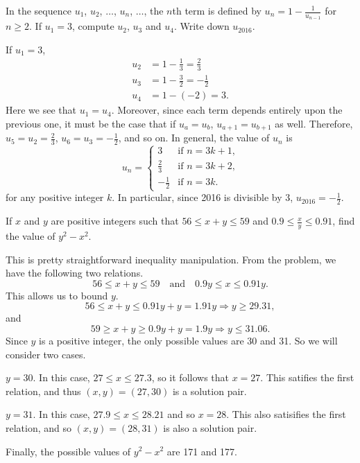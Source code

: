 \begin{question}
    In the sequence $u_{1}$, $u_{2}$, $\ldots$, $u_{n}$, $\ldots$, the $n$th
    term is defined by $u_{n} = 1 - \frac{1}{u_{n - 1}}$ for $n \geq 2$. If
    $u_{1} = 3$, compute $u_{2}$, $u_{3}$ and $u_{4}$. Write down $u_{2016}$.
\end{question}
\begin{solution} 
    If $u_1 = 3$,
    \begin{align*}
        u_2 &= 1 - \frac{1}{3} = \frac{2}{3}\\
        u_3 &= 1 - \frac{3}{2} = -\frac{1}{2}\\
        u_4 &= 1 - (-2) = 3.
    \end{align*}
    Here we see that $u_1 = u_4$. Moreover, since each term depends entirely
    upon the previous one, it must be the case that if $u_a = u_b$, $u_{a + 1}
    = u_{b + 1}$ as well. Therefore, $u_5 = u_2 = \frac{2}{3}$, $u_6 = u_3 =
    -\frac{1}{2}$, and so on. In general, the value of $u_n$ is 
    \[ u_n =
    \begin{cases}
        3 & \text{if $n = 3k + 1$,}\\
        \frac{2}{3} & \text{if $n = 3k + 2$,}\\
        -\frac{1}{2} & \text{if $n = 3k$.}
    \end{cases}
    \]
    for any positive integer $k$. In particular, since 2016 is divisible by 3,
    $u_{2016} = -\frac{1}{2}$.
\end{solution}

\begin{question}
    If $x$ and $y$ are positive integers such that $56 \leq x + y \leq 59$ and
    $0.9 \leq \frac{x}{y} \leq 0.91$, find the value of $y^2 - x^2$.
\end{question}
\begin{solution}
    This is pretty straightforward inequality manipulation. From the problem,
    we have the following two relations. 
    \[ 56 \leq x + y \leq 59 \quad \text{and} \quad 0.9y \leq x \leq 0.91y. \]
    This allows us to bound $y$.
    \[ 56 \leq x + y \leq 0.91y + y = 1.91y \Longrightarrow y \geq 29.31, \]
    and 
    \[ 59 \geq x + y \geq 0.9y + y = 1.9y \Longrightarrow y \leq 31.06. \]
    Since $y$ is a positive integer, the only possible values are 30 and 31. So
    we will consider two cases.
    \begin{case}{$y = 30$.}
        In this case, $27 \leq x \leq 27.3$, so it follows that $x = 27$. This
        satifies the first relation, and thus $(x, y) = (27, 30)$ is a solution
        pair.
    \end{case}
    \begin{case}{$y = 31$.}
        In this case, $27.9 \leq x \leq 28.21$ and so $x = 28$. This also
        satisifies the first relation, and so $(x, y) = (28, 31)$ is also a
        solution pair.
    \end{case}
    Finally, the possible values of $y^2 - x^2$ are 171 and 177.
\end{solution}

